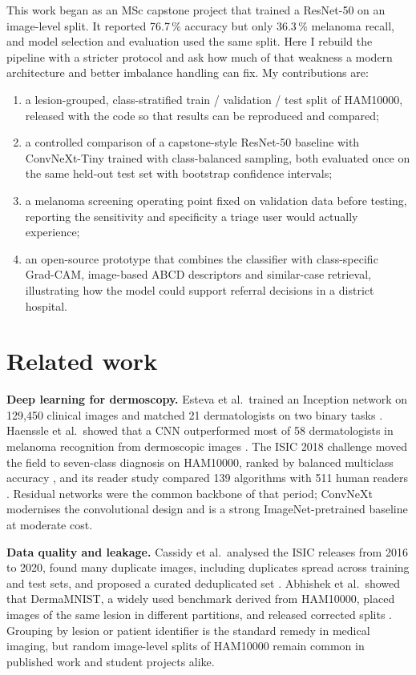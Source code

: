 \documentclass[11pt,a4paper]{article}
\newcommand{\pct}{\,\%}
\begin{document}
This work began as an MSc capstone project that trained a ResNet-50 on an image-level split. It reported 76.7\pct{} accuracy but only 36.3\pct{} melanoma recall, and model selection and evaluation used the same split. Here I rebuild the pipeline with a stricter protocol and ask how much of that weakness a modern architecture and better imbalance handling can fix. My contributions are:
\begin{enumerate}
  \item a lesion-grouped, class-stratified train / validation / test split of HAM10000, released with the code so that results can be reproduced and compared;
  \item a controlled comparison of a capstone-style ResNet-50 baseline with ConvNeXt-Tiny trained with class-balanced sampling, both evaluated once on the same held-out test set with bootstrap confidence intervals;
  \item a melanoma screening operating point fixed on validation data before testing, reporting the sensitivity and specificity a triage user would actually experience;
  \item an open-source prototype that combines the classifier with class-specific Grad-CAM, image-based ABCD descriptors and similar-case retrieval, illustrating how the model could support referral decisions in a district hospital.
\end{enumerate}

\section{Related work}
\textbf{Deep learning for dermoscopy.} Esteva et al.\ trained an Inception network on 129,450 clinical images and matched 21 dermatologists on two binary tasks \cite{esteva2017}. Haenssle et al.\ showed that a CNN outperformed most of 58 dermatologists in melanoma recognition from dermoscopic images \cite{haenssle2018}. The ISIC 2018 challenge moved the field to seven-class diagnosis on HAM10000, ranked by balanced multiclass accuracy \cite{codella2019}, and its reader study compared 139 algorithms with 511 human readers \cite{tschandl2019}. Residual networks \cite{he2016} were the common backbone of that period; ConvNeXt \cite{liu2022} modernises the convolutional design and is a strong ImageNet-pretrained baseline at moderate cost.

\textbf{Data quality and leakage.} Cassidy et al.\ analysed the ISIC releases from 2016 to 2020, found many duplicate images, including duplicates spread across training and test sets, and proposed a curated deduplicated set \cite{cassidy2022}. Abhishek et al.\ showed that DermaMNIST, a widely used benchmark derived from HAM10000, placed images of the same lesion in different partitions, and released corrected splits \cite{abhishek2025}. Grouping by lesion or patient identifier is the standard remedy in medical imaging, but random image-level splits of HAM10000 remain common in published work and student projects alike.
\end{document}
